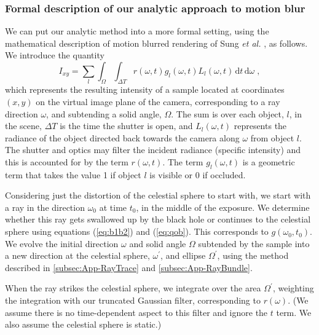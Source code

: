 \documentclass[12pt]{iopart}
\begin{document}
\subsubsection{Formal description of our analytic approach to motion blur}

We can put our analytic method into a more formal setting, using the mathematical description of motion blurred
rendering of Sung {\it et al.} \cite{SUNG}, as follows.  We introduce the quantity
\begin{equation}
I_{xy} = \sum _l\int_{\Omega}\! \int_{\Delta T} r(\omega, t) g_l(\omega, t) L_l(\omega, t) \,\mathrm{d}t
\,\mathrm{d}\omega\;,
\end{equation}
which represents the resulting intensity of a sample located at coordinates $(x,y)$ on the virtual image plane of the camera, corresponding to a ray direction $\omega$, and subtending a solid angle, $\Omega$. The sum is over each object, $l$, in the scene, $\Delta T$ is the time the shutter is open, and $L_l(\omega, t)$ represents the radiance of the object directed back towards the camera along $\omega$ from object $l$. The shutter and optics may filter the incident radiance (specific intensity) and this is accounted for by the term $r(\omega, t)$. The term $g_l(\omega, t)$ is a geometric term that takes the value 1 if object $l$ is visible or 0 if occluded.

Considering just the distortion of the celestial sphere to start with, we start with a ray in the direction $\omega_0$ at time $t_0$, in the middle of the exposure. We determine whether this ray gets swallowed up by the black hole or continues to the celestial sphere using equations (\ref{eq:b1b2}) and (\ref{eq:qob}). This corresponds to $g(\omega_0, t_0)$.
We evolve the initial direction $\omega$ and solid angle $\Omega$ subtended by the sample into a new direction at the celestial sphere, $\omega^\prime$, and ellipse $\Omega^\prime$, using the method described in  \ref{subsec:App-RayTrace}
and \ref{subsec:App-RayBundle}.

When the ray strikes the celestial sphere, we integrate over the area $\Omega^\prime$, weighting the integration with our truncated Gaussian filter, corresponding to $r(\omega)$. (We assume there is no
time-dependent aspect to this filter and ignore the $t$ term. We also assume the celestial sphere
is static.)
\end{document}

